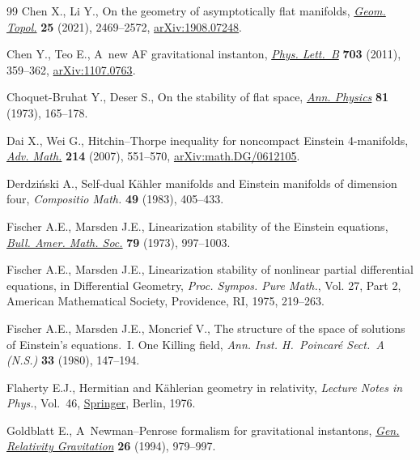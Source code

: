 \begin{thebibliography}{99}
Chen X., Li Y., On the geometry of asymptotically flat manifolds, \href{https://doi.org/10.2140/gt.2021.25.2469}{\textit{Geom.
 Topol.}} \textbf{25} (2021), 2469--2572, \href{https://arxiv.org/abs/1908.07248}{arXiv:1908.07248}.

Chen Y., Teo E., A~new {AF} gravitational instanton, \href{https://doi.org/10.1016/j.physletb.2011.07.076}{\textit{Phys. Lett.~B}}
 \textbf{703} (2011), 359--362, \href{https://arxiv.org/abs/1107.0763}{arXiv:1107.0763}.

Choquet-Bruhat Y., Deser S., On the stability of flat space, \href{https://doi.org/10.1016/0003-4916(73)90484-3}{\textit{Ann.
 Physics}} \textbf{81} (1973), 165--178.

Dai X., Wei G., Hitchin--{T}horpe inequality for noncompact {E}instein
 4-manifolds, \href{https://doi.org/10.1016/j.aim.2007.02.010}{\textit{Adv. Math.}} \textbf{214} (2007), 551--570,
 \href{https://arxiv.org/abs/math.DG/0612105}{arXiv:math.DG/0612105}.

Derdzi\'nski A., Self-dual {K}\"ahler manifolds and {E}instein manifolds of
 dimension four, \textit{Compositio Math.} \textbf{49} (1983), 405--433.

Fischer A.E., Marsden J.E., Linearization stability of the {E}instein
 equations, \href{https://doi.org/10.1090/S0002-9904-1973-13299-9}{\textit{Bull. Amer. Math. Soc.}} \textbf{79} (1973), 997--1003.

Fischer A.E., Marsden J.E., Linearization stability of nonlinear partial
 differential equations, in Differential Geometry, \textit{Proc. Sympos. Pure Math.}, Vol. 27, Part 2, American
 Mathematical Society, Providence, RI, 1975, 219--263.

Fischer A.E., Marsden J.E., Moncrief V., The structure of the space of
 solutions of {E}instein's equations.~{I}. {O}ne {K}illing field, \textit{Ann.
 Inst. H.~Poincar\'e Sect.~A (N.S.)} \textbf{33} (1980), 147--194.

Flaherty E.J., Hermitian and {K}\"ahlerian geometry in relativity,
 \textit{Lecture Notes in Phys.}, Vol.~46, \href{https://doi.org/10.1007/3-540-07540-2}{Springer}, Berlin, 1976.

Goldblatt E., A~{N}ewman--{P}enrose formalism for gravitational instantons,
 \href{https://doi.org/10.1007/BF02106666}{\textit{Gen. Relativity Gravitation}} \textbf{26} (1994), 979--997.


\end{thebibliography}
